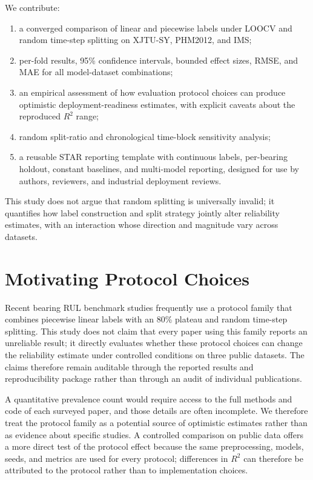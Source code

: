 \documentclass[pdflatex,sn-mathphys-num]{sn-jnl}
\begin{document}
We contribute:
\begin{enumerate}
    \item a converged comparison of linear and piecewise labels under LOOCV and random time-step splitting on XJTU-SY, PHM2012, and IMS;
    \item per-fold results, 95\% confidence intervals, bounded effect sizes, RMSE, and MAE for all model-dataset combinations;
    \item an empirical assessment of how evaluation protocol choices can produce optimistic deployment-readiness estimates, with explicit caveats about the reproduced $R^2$ range;
    \item random split-ratio and chronological time-block sensitivity analysis;
    \item a reusable STAR reporting template with continuous labels, per-bearing holdout, constant baselines, and multi-model reporting, designed for use by authors, reviewers, and industrial deployment reviews.
\end{enumerate}
This study does not argue that random splitting is universally invalid; it quantifies how label construction and split strategy jointly alter reliability estimates, with an interaction whose direction and magnitude vary across datasets.


\section{Motivating Protocol Choices}
Recent bearing RUL benchmark studies frequently use a protocol family that combines piecewise linear labels with an 80\% plateau and random time-step splitting. This study does not claim that every paper using this family reports an unreliable result; it directly evaluates whether these protocol choices can change the reliability estimate under controlled conditions on three public datasets. The claims therefore remain auditable through the reported results and reproducibility package rather than through an audit of individual publications.

A quantitative prevalence count would require access to the full methods and code of each surveyed paper, and those details are often incomplete. We therefore treat the protocol family as a potential source of optimistic estimates rather than as evidence about specific studies. A controlled comparison on public data offers a more direct test of the protocol effect because the same preprocessing, models, seeds, and metrics are used for every protocol; differences in $R^2$ can therefore be attributed to the protocol rather than to implementation choices.
\end{document}
